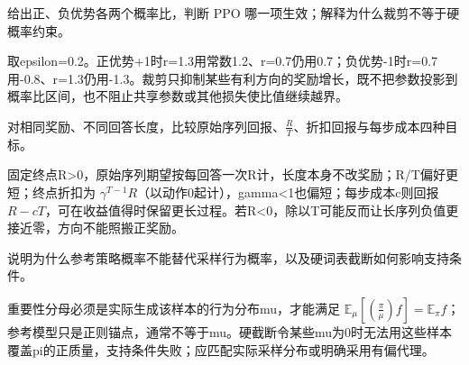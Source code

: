 \begin{exercises}
\begin{exercise} 给出正、负优势各两个概率比，判断 PPO 哪一项生效；解释为什么裁剪不等于硬概率约束。

\begin{solution}
取epsilon=0.2。正优势+1时r=1.3用常数1.2、r=0.7仍用0.7；负优势-1时r=0.7用-0.8、r=1.3仍用-1.3。裁剪只抑制某些有利方向的奖励增长，既不把参数投影到概率比区间，也不阻止共享参数或其他损失使比值继续越界。
\end{solution}
\end{exercise}

\begin{exercise} 对相同奖励、不同回答长度，比较原始序列回报、$\frac{R}{T}$、折扣回报与每步成本四种目标。

\begin{solution}
固定终点R>0，原始序列期望按每回答一次R计，长度本身不改奖励；R/T偏好更短；终点折扣为 $\gamma^{T-1}R$（以动作0起计），gamma<1也偏短；每步成本c则回报 $R-cT$，可在收益值得时保留更长过程。若R<0，除以T可能反而让长序列负值更接近零，方向不能照搬正奖励。
\end{solution}
\end{exercise}

\begin{exercise} 说明为什么参考策略概率不能替代采样行为概率，以及硬词表截断如何影响支持条件。

\begin{solution}
重要性分母必须是实际生成该样本的行为分布mu，才能满足 $\mathbb E_\mu[(\frac{\pi}{\mu})f]=\mathbb E_\pi f$；参考模型只是正则锚点，通常不等于mu。硬截断令某些mu为0时无法用这些样本覆盖pi的正质量，支持条件失败；应匹配实际采样分布或明确采用有偏代理。
\end{solution}
\end{exercise}

\end{exercises}
